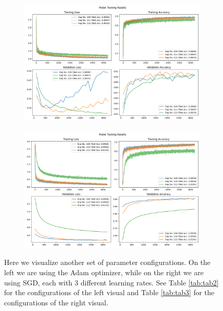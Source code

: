 \documentclass[10pt]{amsart}
\begin{document}
\begin{figure}[h]
    \centering
    \begin{subfigure}{0.49\textwidth}
        \centering
        \includegraphics[width=.6\textwidth]{../visualizations/model_training_results_vis_13.png}
        \label{fig:image1}
    \end{subfigure}
    \begin{subfigure}{0.49\textwidth}
        \centering
        \includegraphics[width=.6\textwidth]{../visualizations/model_training_results_vis_14.png}
        \label{fig:image2}
    \end{subfigure}
    \caption{Here we visualize another set of parameter configurations.
    On the left we are using the Adam optimizer, while on the right we are using SGD, each with 3 different learning rates.
    See Table \ref{tab:tab2} for the configurations of the left visual and Table \ref{tab:tab3} for the configurations of the right visual.}
    \label{fig:f1}
\end{figure}
\end{document}

